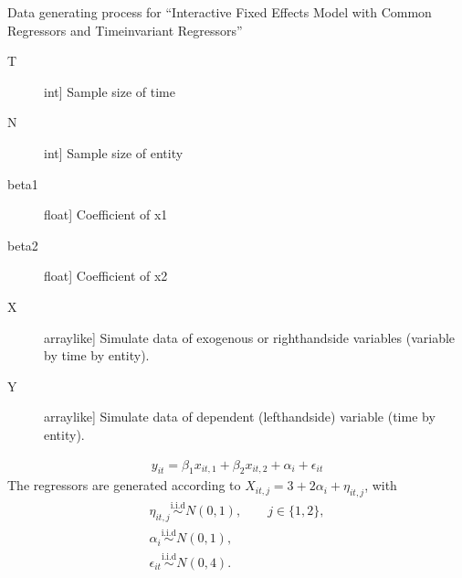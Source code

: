 \documentclass[a4paper,11pt,english]{sphinxmanual}
\begin{document}
\begin{fulllineitems}
\label{\detokenize{analysis:src.analysis.monte_carlo_dgp.dgp_time_invariant_fixed_effects_model}}
\sphinxAtStartPar
Data generating process for “Interactive Fixed Effects Model with Common
Regressors and Time\sphinxhyphen{}invariant Regressors”
\begin{description}
\item[{T}] \leavevmode{[}int{]}
\sphinxAtStartPar
Sample size of time

\item[{N}] \leavevmode{[}int{]}
\sphinxAtStartPar
Sample size of entity

\item[{beta1}] \leavevmode{[}float{]}
\sphinxAtStartPar
Coefficient of x1

\item[{beta2}] \leavevmode{[}float{]}
\sphinxAtStartPar
Coefficient of x2

\end{description}
\begin{description}
\item[{X}] \leavevmode{[}array\sphinxhyphen{}like{]}
\sphinxAtStartPar
Simulate data of exogenous or right\sphinxhyphen{}hand\sphinxhyphen{}side variables (variable by time by
entity).

\item[{Y}] \leavevmode{[}array\sphinxhyphen{}like{]}
\sphinxAtStartPar
Simulate data of dependent (left\sphinxhyphen{}hand\sphinxhyphen{}side) variable (time by entity).

\end{description}
\begin{equation*}
\begin{split}y_{it} = \beta_{1}x_{it,1}+\beta_{2}x_{it,2}+\alpha_{i}+\epsilon_{it}\end{split}
\end{equation*}
\sphinxAtStartPar
The regressors are generated according to \(X_{it,j}=3+2\alpha_i+\eta_{it,j}\),
with
\begin{equation*}
\begin{split}\eta_{it,j}\stackrel{\text{i.i.d}}{\sim} N(0,1), \qquad j\in \{1,2\},\\
\alpha_i\stackrel{\text{i.i.d}}{\sim} N(0,1),\\
\epsilon_{it}\stackrel{\text{i.i.d}}{\sim} N(0,4).\end{split}
\end{equation*}
\end{fulllineitems}
\end{document}
